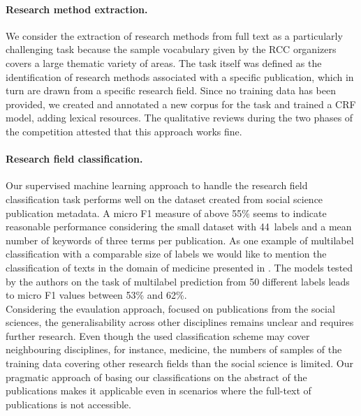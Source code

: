 \paragraph{Research method extraction.} %
We consider the extraction of research methods from full text as a particularly challenging task because the sample vocabulary given by the RCC organizers covers a large thematic variety of areas.
The task itself was defined as the identification of research methods associated with a specific publication, which in turn are drawn from a specific research field.
Since no training data has been provided, we created and annotated a new corpus for the task and trained a CRF model, adding lexical resources.
The qualitative reviews during the two phases of the competition attested that this approach works fine.




\paragraph{Research field classification.}
Our supervised machine learning approach to handle the research field classification task performs well on the dataset created from social science publication metadata. A micro F1 measure of above 55\% seems to indicate reasonable performance considering the small dataset with 44~labels and a mean number of keywords of three terms per publication.
As one example of multilabel classification with a comparable size of labels we would like to mention the classification of texts in the domain of medicine presented in \cite{wang2018joint}.
The models tested by the authors on the task of multilabel prediction from 50 different labels leads to micro F1 values between 53\% and 62\%.\\
Considering the evaulation approach, focused on publications from the social sciences, the generalisability across other disciplines remains unclear and requires further research.
Even though the used classification scheme may cover neighbouring disciplines, for instance, medicine, the numbers of samples of the training data covering other research fields than the social science is limited.
Our pragmatic approach of basing our classifications on the abstract of the publications makes it applicable even in scenarios where the full-text of publications is not accessible. %


